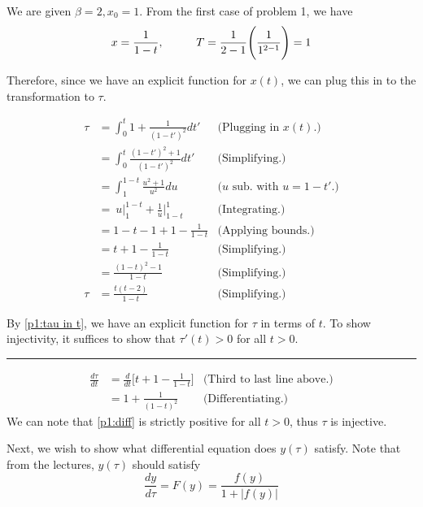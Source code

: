\begin{solution}

    We are given $\beta = 2, x_0 = 1$. From the first case of problem 1, we have
    \[
    x = \frac{1}{1 - t}, \hspace{10mm} T = \frac{1}{2 - 1}\Bigg(\frac{1}{1^{2 - 1}}\Bigg) = 1
    \]

    Therefore, since we have an explicit function for $x(t)$, we can plug this in to the transformation to $\tau$.

    \alignbreak
    \begin{align}
        \tau &= \int_0^{t} 1 + \frac{1}{(1 - t')^2}dt' &\text{(Plugging in $x(t)$.)}\nonumber\\
        &= \int_0^{t} \frac{(1 - t')^2 + 1}{(1 - t')^2}dt' &\text{(Simplifying.)}\nonumber\\
        &= \int_1^{1-t} \frac{u^2 + 1}{u^2} du &\text{($u$ sub. with $u = 1 - t'$.)} \nonumber\\
        &= \ u\bigg|_1^{1 - t} + \frac{1}{u}\bigg|^1_{1 - t} &\text{(Integrating.)}\nonumber\\
        &= 1 - t - 1 + 1 - \frac{1}{1 - t} &\text{(Applying bounds.)}\nonumber\\
        &= t + 1 - \frac{1}{1-t} &\text{(Simplifying.)}\nonumber\\
        &= \frac{(1 - t)^2 - 1}{1 - t} &\text{(Simplifying.)}\nonumber\\
        \tau&= \frac{t(t - 2)}{1 - t} &\text{(Simplifying.)} \label{p1:tau in t}
    \end{align}
    \alignbreak

    By \ref{p1:tau in t}, we have an explicit function for $\tau$ in terms of $t$. To show injectivity, it suffices to show that $\tau'(t) > 0$ for all $t > 0$.

    \begin{center}\rule{15cm}{0.5pt}\end{center}
    \begin{align}
        \frac{d\tau}{dt} &= \frac{d}{dt}\bigg[ t + 1 - \frac{1}{1 - t}\bigg] &\text{(Third to last line above.)}\nonumber\\
        &= 1 + \frac{1}{(1 - t)^2} &\text{(Differentiating.)} \label{p1:diff}
    \end{align}
    \alignbreak
    We can note that \ref{p1:diff} is strictly positive for all $t > 0$, thus $\tau$ is injective.

    Next, we wish to show what differential equation does $y(\tau)$ satisfy. Note that from the lectures, $y(\tau)$ should satisfy
    \[\frac{dy}{d\tau} = F(y) = \frac{f(y)}{1 + |f(y)|}\]


\end{solution}
